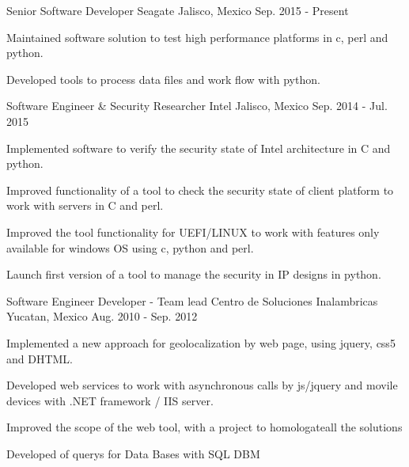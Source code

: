 


\begin{cventries}


\cventry
{Senior Software Developer} %
{Seagate} %
{Jalisco, Mexico} %
{Sep. 2015 - Present } %
{ %
\begin{cvitems}
\item {Maintained software solution to test high performance platforms in c, perl and python.}
\item {Developed tools to process data files and work flow with python.}
\end{cvitems}
}


\cventry
{Software Engineer \& Security Researcher} %
{Intel} %
{Jalisco, Mexico} %
{Sep. 2014 -  Jul. 2015} %
{ %
\begin{cvitems}
\item {Implemented software to verify the security state of Intel architecture in C and python.}
\item {Improved functionality of a tool to check the security state of client platform to work with servers in C and perl.}
\item {Improved the tool functionality for UEFI/LINUX to work with features only available for windows OS using c, python and perl.}
\item {Launch first version of a tool to manage the security in IP designs in python.}
\end{cvitems}
}


\cventry
{Software Engineer Developer - Team lead } %
{Centro de Soluciones Inalambricas} %
{Yucatan, Mexico} %
{Aug. 2010 - Sep. 2012} %
{ %
\begin{cvitems}
\item {Implemented a new approach for geolocalization by web page, using jquery, css5 and DHTML.}
\item {Developed web services to work with asynchronous calls by js/jquery and movile devices with .NET framework / IIS server.}
\item {Improved the scope of the web tool, with a project to homologateall the solutions}
\item {Developed of querys for Data Bases with SQL DBM}
\end{cvitems} 
}


\end{cventries}
